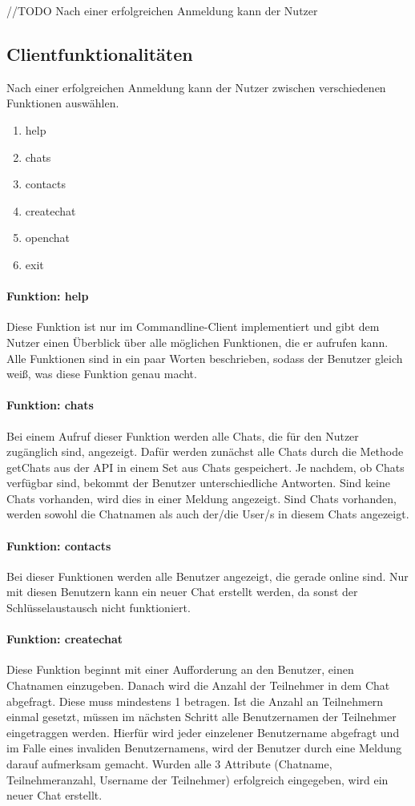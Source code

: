 //TODO Nach einer erfolgreichen Anmeldung kann der Nutzer
\author{Jan Grübener, Troy Keßler, Patrick Mischka, Michael Angermeier}
\subsection{Clientfunktionalitäten}
Nach einer erfolgreichen Anmeldung kann der Nutzer zwischen verschiedenen Funktionen auswählen.
\begin{enumerate}
    \item help
    \item chats
    \item contacts
    \item createchat
    \item openchat
    \item exit
\end{enumerate}
\paragraph{Funktion: help}
Diese Funktion ist nur im Commandline-Client implementiert und gibt dem Nutzer einen Überblick
über alle möglichen Funktionen, die er aufrufen kann. Alle Funktionen sind in ein paar Worten beschrieben,
sodass der Benutzer gleich weiß, was diese Funktion genau macht.
\paragraph{Funktion: chats}
Bei einem Aufruf dieser Funktion werden alle Chats, die für den Nutzer zugänglich sind, angezeigt.
Dafür werden zunächst alle Chats durch die Methode getChats aus der API in einem Set aus Chats gespeichert.
Je nachdem, ob Chats verfügbar sind, bekommt der Benutzer unterschiedliche Antworten.
Sind keine Chats vorhanden, wird dies in einer Meldung angezeigt.
Sind Chats vorhanden, werden sowohl die Chatnamen als auch der/die User/s in diesem Chats angezeigt.
\paragraph{Funktion: contacts}
Bei dieser Funktionen werden alle Benutzer angezeigt, die gerade online sind. Nur mit diesen Benutzern kann ein neuer
Chat erstellt werden, da sonst der Schlüsselaustausch nicht funktioniert.
\paragraph{Funktion: createchat}
Diese Funktion beginnt mit einer Aufforderung an den Benutzer, einen Chatnamen einzugeben.
Danach wird die Anzahl der Teilnehmer in dem Chat abgefragt. Diese muss mindestens 1 betragen.
Ist die Anzahl an Teilnehmern einmal gesetzt, müssen im nächsten Schritt alle Benutzernamen
der Teilnehmer eingetraggen werden. Hierfür wird jeder einzelener Benutzername abgefragt und
im Falle eines invaliden Benutzernamens, wird der Benutzer durch eine Meldung darauf aufmerksam gemacht.
Wurden alle 3 Attribute (Chatname, Teilnehmeranzahl, Username der Teilnehmer) erfolgreich eingegeben,
wird ein neuer Chat erstellt.
